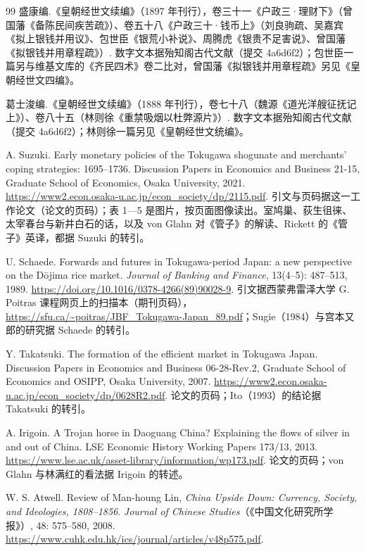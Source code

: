 \begin{thebibliography}{99}
 盛康编.《皇朝经世文续编》（1897 年刊行），卷三十一《户政三·理财下》（曾国藩《备陈民间疾苦疏》）、卷五十八《户政三十·钱币上》（刘良驹疏、吴嘉宾《拟上银钱并用议》、包世臣《银荒小补说》、周腾虎《银贵不足害说》、曾国藩《拟银钱并用章程疏》）. 数字文本据殆知阁古代文献（提交 4a6d6f2）；包世臣一篇另与维基文库的《齐民四术》卷二比对，曾国藩《拟银钱并用章程疏》另见《皇朝经世文四编》。

 葛士浚编.《皇朝经世文续编》（1888 年刊行），卷七十八（魏源《道光洋艘征抚记上》）、卷八十五（林则徐《重禁吸烟以杜弊源片》）. 数字文本据殆知阁古代文献（提交 4a6d6f2）；林则徐一篇另见《皇朝经世文统编》。

 A. Suzuki. Early monetary policies of the Tokugawa shogunate and merchants' coping strategies: 1695--1736. Discussion Papers in Economics and Business 21-15, Graduate School of Economics, Osaka University, 2021. \url{https://www2.econ.osaka-u.ac.jp/econ_society/dp/2115.pdf}. 引文与页码据这一工作论文（论文的页码）；表 1—5 是图片，按页面图像读出。室鸠巢、荻生徂徕、太宰春台与新井白石的话，以及 von Glahn 对《管子》的解读、Rickett 的《管子》英译，都据 Suzuki 的转引。

 U. Schaede. Forwards and futures in Tokugawa-period Japan: a new perspective on the Dōjima rice market. \emph{Journal of Banking and Finance}, 13(4--5): 487--513, 1989. \url{https://doi.org/10.1016/0378-4266(89)90028-9}. 引文据西蒙弗雷泽大学 G. Poitras 课程网页上的扫描本（期刊页码），\url{https://sfu.ca/~poitras/JBF_Tokugawa-Japan_89.pdf}；Sugie（1984）与宫本又郎的研究据 Schaede 的转引。

 Y. Takatsuki. The formation of the efficient market in Tokugawa Japan. Discussion Papers in Economics and Business 06-28-Rev.2, Graduate School of Economics and OSIPP, Osaka University, 2007. \url{https://www2.econ.osaka-u.ac.jp/econ_society/dp/0628R2.pdf}. 论文的页码；Ito（1993）的结论据 Takatsuki 的转引。

 A. Irigoin. A Trojan horse in Daoguang China? Explaining the flows of silver in and out of China. LSE Economic History Working Papers 173/13, 2013. \url{https://www.lse.ac.uk/asset-library/information/wp173.pdf}. 论文的页码；von Glahn 与林满红的看法据 Irigoin 的转述。

 W. S. Atwell. Review of Man-houng Lin, \emph{China Upside Down: Currency, Society, and Ideologies, 1808--1856}. \emph{Journal of Chinese Studies}（《中国文化研究所学报》）, 48: 575--580, 2008. \url{https://www.cuhk.edu.hk/ics/journal/articles/v48p575.pdf}.


\end{thebibliography}
